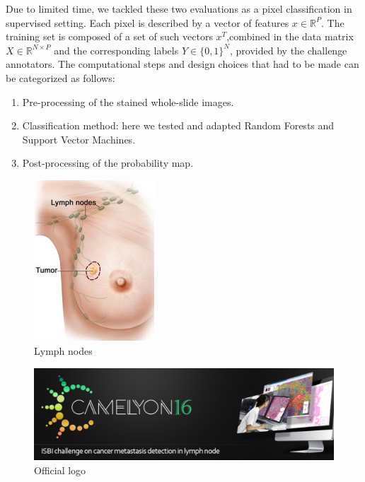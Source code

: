 \documentclass{article}
\begin{document}
Due to limited time, we tackled these two evaluations as a pixel classification in supervised setting. Each pixel is described by a vector of features $x \in \mathbb{R}^P$. The training set is composed of a set of such vectors $x^T$,combined in the data matrix $X \in \mathbb{R}^{N \times P}$ and the corresponding labels $Y \in \{0,1\}^N$, provided by the challenge annotators. 
The computational steps and design choices that had to be made can be categorized as follows: 
\begin{enumerate}
	\item Pre-processing of the stained whole-slide images.
         \item Classification method: here we tested and adapted
           Random Forests and Support Vector Machines. 
         \item Post-processing of the probability map.
\end{enumerate}

\begin{figure}[!ht]
\centering
\includegraphics[width=0.4\textwidth]{Booby.png}
\caption{Lymph nodes}
\label{LymphNode}
\end{figure}

\begin{figure}[!ht]
\centering
\includegraphics[width=\textwidth]{Camelyon16.png}
\caption{Official logo}
\label{Ol}
\end{figure}
\end{document}
